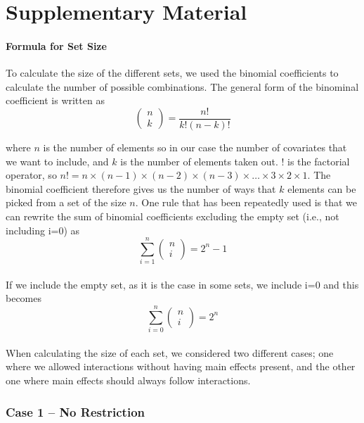 \part*{Supplementary Material} 

\setcounter{table}{0}
\setcounter{figure}{0}
\renewcommand{\thetable}{S\arabic{table}}
\renewcommand{\thefigure}{S\arabic{figure}}

\subsection{Formula for Set Size}
To calculate the size of the different sets, we used the binomial coefficients to calculate the number of possible combinations. The general form of the binominal coefficient is written as
\[\left( \begin{array}{c}
n \\ 
k \end{array}
\right)=\frac{n!}{k!\left(n-k\right)!}\] 

where $n$ is the number of elements so in our case the number of covariates that we want to include, and $k$ is the number of elements taken out. $!$ is the factorial operator, so $n!=n\times \left(n-1\right)\times \left(n-2\right)\times \left(n-3\right)\times \dots \times 3\times 2\times 1$. The binomial coefficient therefore gives us the number of ways that $k$ elements can be picked from a set of the size $n$. One rule that has been repeatedly used is that we can rewrite the sum of binomial coefficients excluding the empty set (i.e., not including i=0) as 
\[\sum^n_{i=1}{\left( \begin{array}{c}
n \\ 
i \end{array}
\right)}=2^n-1\] 
\\
If we include the empty set, as it is the case in some sets, we include i=0 and this becomes
\[\sum^n_{i=0}{\left( \begin{array}{c}
n \\ 
i \end{array}
\right)}=2^n\] 
\\
When calculating the size of each set, we considered two different cases; one where we allowed interactions without having main effects present, and the other one where main effects should always follow interactions. \\

\section{Case 1 – No Restriction}
